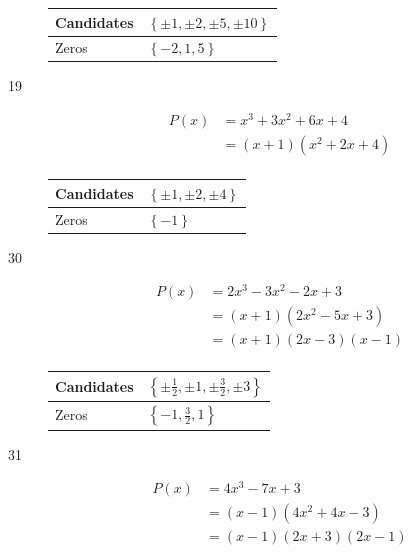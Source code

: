 \documentclass{exam}
\begin{document}
\begin{description}
        \begin{tabular}{ll}
          \toprule
          Candidates & $\left\{ \pm 1, \pm 2, \pm 5, \pm 10 \right\}$ \\
          \midrule
          Zeros      & $\left\{ -2, 1, 5 \right\}$ \\
          \bottomrule
        \end{tabular}

        \vspace{.5 cm}

      \item[19]
        \begin{align*}
          P(x) &= x^3 + 3x^2 + 6x + 4 \\
               &= (x + 1)(x^2 + 2x + 4) \\
        \end{align*}

        \begin{tabular}{ll}
          \toprule
          Candidates & $\left\{ \pm 1, \pm 2, \pm 4 \right\}$ \\
          \midrule
          Zeros      & $\left\{ -1 \right\}$ \\
          \bottomrule
        \end{tabular}

        \vspace{.5 cm}

      \item[30]
        \begin{align*}
          P(x) &= 2x^3 - 3x^2 - 2x + 3 \\
               &= (x + 1)(2x^2 - 5x + 3) \\
               &= (x + 1)(2x - 3)(x - 1) \\
        \end{align*}

        \begin{tabular}{ll}
          \toprule
          Candidates & $\left\{ \pm \frac{1}{2}, \pm 1, \pm \frac{3}{2}, \pm 3 \right\}$ \\
          \midrule
          Zeros      & $\left\{ -1, \frac{3}{2}, 1 \right\}$ \\
          \bottomrule
        \end{tabular}

        \vspace{.5 cm}

      \item[31]
        \begin{align*}
          P(x) &= 4x^3 - 7x + 3 \\
               &= (x - 1)(4x^2 + 4x - 3) \\
               &= (x - 1)(2x + 3)(2x - 1) \\
        \end{align*}


\end{description}
\end{document}

